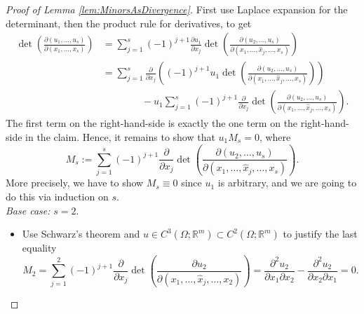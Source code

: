 \begin{proof}[Proof of Lemma \ref{lem:MinorsAsDivergence}]
First use Laplace expansion for the determinant, then the product rule for derivatives, to get
\begin{align*}
	\det\left(\frac{\partial(u_1,\dotsc,u_s)}{\partial(x_1,\dotsc,x_s)}\right)&=\sum_{j=1}^s{(-1)^{j+1}\frac{\partial u_1}{\partial x_j}\det\left(\frac{\partial(u_2,\dotsc,u_s)}{\partial(x_1,\dotsc,\widehat{x}_j,\dotsc,x_s)}\right)}\\
	&=\sum_{j=1}^s{\frac{\partial}{\partial x_j}\left((-1)^{j+1}u_1\det\left(\frac{\partial(u_2,\dotsc,u_s)}{\partial(x_1,\dotsc,\widehat{x}_j,\dotsc,x_s)}\right)\right)}\\
	&\qquad\qquad-u_1\sum_{j=1}^s{(-1)^{j+1}\frac{\partial}{\partial x_j}\det\left(\frac{\partial(u_2,\dotsc,u_s)}{\partial(x_1,\dotsc,\widehat{x}_j,\dotsc,x_s)}\right)}.
\end{align*}
The first term on the right-hand-side is exactly the one term on the right-hand-side in the claim. Hence, it remains to show that $u_1M_s=0$, where
\[M_s:=\sum_{j=1}^s{(-1)^{j+1}\frac{\partial}{\partial x_j}\det\left(\frac{\partial(u_2,\dotsc,u_s)}{\partial(x_1,\dotsc,\widehat{x}_j,\dotsc,x_s)}\right)}.\]
More precisely, we have to show $M_s\equiv0$ since $u_1$ is arbitrary, and we are going to do this via induction on $s$.\\

\textit{Base case:} $s=2$.
\begin{itemize}
	\item[] Use Schwarz's theorem and $u\in C^3(\Omega;\mathbb{R}^m)\subset C^2(\Omega;\mathbb{R}^m)$ to justify the last equality
	\[M_2=\sum_{j=1}^2{(-1)^{j+1}\frac{\partial}{\partial x_j}\det\left(\frac{\partial u_2}{\partial(x_1,\dotsc,\widehat{x}_j,\dotsc,x_2)}\right)}=\frac{\partial^2u_2}{\partial x_1\partial x_2}-\frac{\partial^2u_2}{\partial x_2\partial x_1}=0.\]
\end{itemize}


\end{proof}
